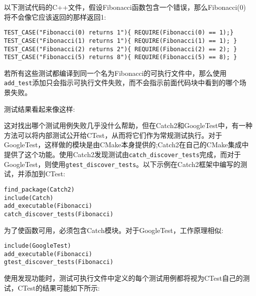 以下测试代码的C++文件，假设Fibonacci函数包含一个错误，那么Fibonacci(0)将不会像它应该返回的那样返回1:

\begin{lstlisting}[style=styleCXX]
TEST_CASE("Fibonacci(0) returns 1"){ REQUIRE(Fibonacci(0) == 1);}
TEST_CASE("Fibonacci(1) returns 1"){ REQUIRE(Fibonacci(1) == 1); }
TEST_CASE("Fibonacci(2) returns 2"){ REQUIRE(Fibonacci(2) == 2); }
TEST_CASE("Fibonacci(5) returns 8"){ REQUIRE(Fibonacci(5) == 8); }
\end{lstlisting}

若所有这些测试都编译到同一个名为Fibonacci的可执行文件中，那么使用\texttt{add\_test}添加只会指示可执行文件失败，而不会指示前面代码块中看到的哪个场景失败。

测试结果看起来像这样:


这对找出哪个测试用例失败几乎没什么帮助，但在Catch2和GoogleTest中，有一种方法可以将内部测试公开给CTest，从而将它们作为常规测试执行。对于GoogleTest，这样做的模块是由CMake本身提供的;Catch2在自己的CMake集成中提供了这个功能。使用Catch2发现测试由\texttt{catch\_discover\_tests}完成，而对于GoogleTest，则使用\texttt{gtest\_discover\_tests}。以下示例在Catch2框架中编写的测试，并添加到CTest:

\begin{lstlisting}[style=styleCMake]
find_package(Catch2)
include(Catch)
add_executable(Fibonacci)
catch_discover_tests(Fibonacci)
\end{lstlisting}

为了使函数可用，必须包含Catch模块。对于GoogleTest，工作原理相似:

\begin{lstlisting}[style=styleCMake]
include(GoogleTest)
add_executable(Fibonacci)
gtest_discover_tests(Fibonacci)
\end{lstlisting}

使用发现功能时，测试可执行文件中定义的每个测试用例都将视为CTest自己的测试，CTest的结果可能如下所示:


